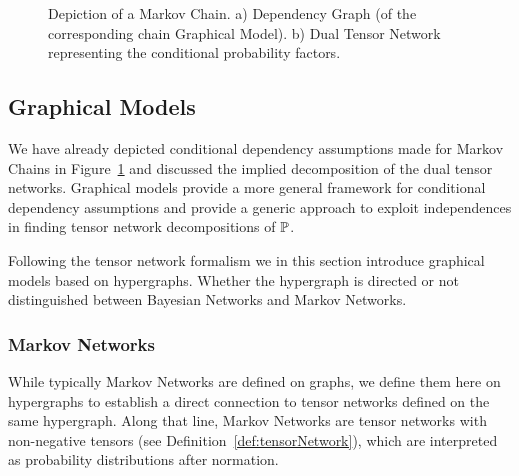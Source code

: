 \begin{figure}[h]
\begin{center}
	
\end{center}
\caption{Depiction of a Markov Chain. 
	a) Dependency Graph (of the corresponding chain Graphical Model).
	b) Dual Tensor Network representing the conditional probability factors.}
\label{fig:MC}
\end{figure}





\subsection{Graphical Models}



We have already depicted conditional dependency assumptions made for Markov Chains in Figure~\ref{fig:MC} and discussed the implied decomposition of the dual tensor networks.
Graphical models provide a more general framework for conditional dependency assumptions and provide a generic approach to exploit independences in finding tensor network decompositions of $\mathbb{P}$.


Following the tensor network formalism we in this section introduce graphical models based on hypergraphs.
Whether the hypergraph is directed or not distinguished between Bayesian Networks and Markov Networks.







\subsubsection{Markov Networks}

While typically Markov Networks are defined on graphs, we define them here on hypergraphs to establish a direct connection to tensor networks defined on the same hypergraph.
Along that line, Markov Networks are tensor networks with non-negative tensors (see Definition~\ref{def:tensorNetwork}), which are interpreted as probability distributions after normation.


